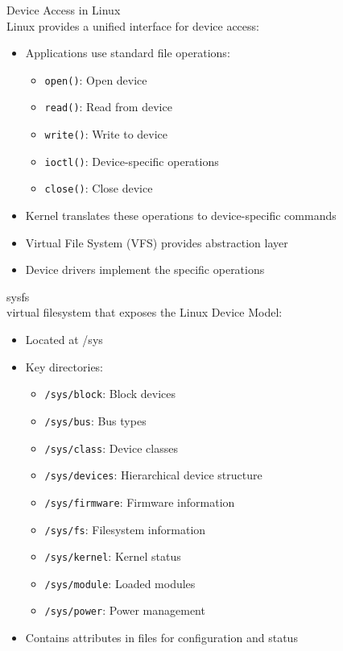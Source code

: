 \begin{concept}{Device Access in Linux}\\
    Linux provides a unified interface for device access:
    \begin{itemize}
        \item Applications use standard file operations:
            \begin{itemize}
                \item \texttt{open()}: Open device
                \item \texttt{read()}: Read from device
                \item \texttt{write()}: Write to device
                \item \texttt{ioctl()}: Device-specific operations
                \item \texttt{close()}: Close device
            \end{itemize}
        \item Kernel translates these operations to device-specific commands
        \item Virtual File System (VFS) provides abstraction layer
        \item Device drivers implement the specific operations
    \end{itemize}
\end{concept}

\multend


\begin{definition}{sysfs}\\
    virtual filesystem that exposes the Linux Device Model:
    \begin{itemize}
        \item Located at /sys
        \item Key directories:
            \begin{itemize}
                \item \texttt{/sys/block}: Block devices
                \item \texttt{/sys/bus}: Bus types
                \item \texttt{/sys/class}: Device classes
                \item \texttt{/sys/devices}: Hierarchical device structure
                \item \texttt{/sys/firmware}: Firmware information
                \item \texttt{/sys/fs}: Filesystem information
                \item \texttt{/sys/kernel}: Kernel status
                \item \texttt{/sys/module}: Loaded modules
                \item \texttt{/sys/power}: Power management
            \end{itemize}
        \item Contains attributes in files for configuration and status
    \end{itemize}
\end{definition}

